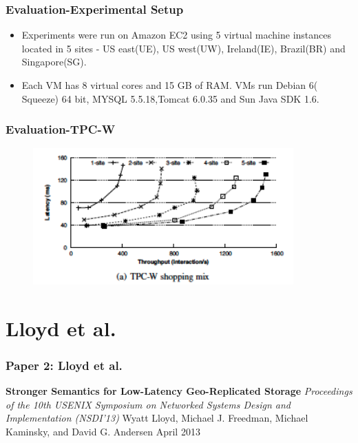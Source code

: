 \documentclass{beamer}
\begin{document}

\begin{frame}
\frametitle{Evaluation-Experimental Setup}
\begin{itemize}
\item Experiments were run on Amazon EC2 using 5 virtual machine instances located in 5 sites - US east(UE), US west(UW), Ireland(IE), Brazil(BR) and Singapore(SG).
\item Each VM has 8 virtual cores and 15 GB of RAM. VMs run Debian 6( Squeeze) 64 bit, MYSQL 5.5.18,Tomcat 6.0.35 and Sun Java SDK 1.6.
\end{itemize}
\end{frame}


\begin{frame}
\frametitle{Evaluation-TPC-W}
\begin{figure}[t]
\includegraphics[width=10cm]{pic18.jpg}
\centering
\end{figure}
\end{frame}



\section{Lloyd et al.} 

\begin{frame}
\frametitle{Paper 2: Lloyd et al.}

\textbf{Stronger Semantics for Low-Latency Geo-Replicated Storage} \newline
\textit{Proceedings of the 10th USENIX Symposium on Networked Systems Design and Implementation (NSDI’13)} \newline
Wyatt Lloyd, Michael J. Freedman, Michael Kaminsky, and David G. Andersen \newline
April 2013 \newline

\end{frame}
\end{document}
